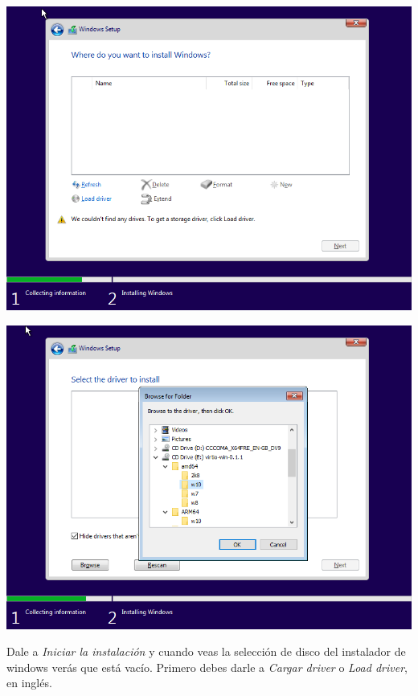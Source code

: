 \documentclass[12pt]{article}
\begin{document}
\begin{multicols}{2}
\begin{minipage}[t]{\linewidth}%
\vspace{0pt}
\centering
\includegraphics[width=\textwidth]{assets/Screenshot_win10-7.png}
\end{minipage}
\begin{minipage}[t]{\linewidth}%
\vspace{0pt}
\centering
\includegraphics[width=\textwidth]{assets/Screenshot_win10-9.png}
\end{minipage}
\end{multicols}

Dale a \emph{Iniciar la instalación} y cuando veas la selección de disco del instalador de windows verás que está vacío. Primero debes darle a \emph{Cargar driver} o \emph{Load driver}, en inglés.
\end{document}
